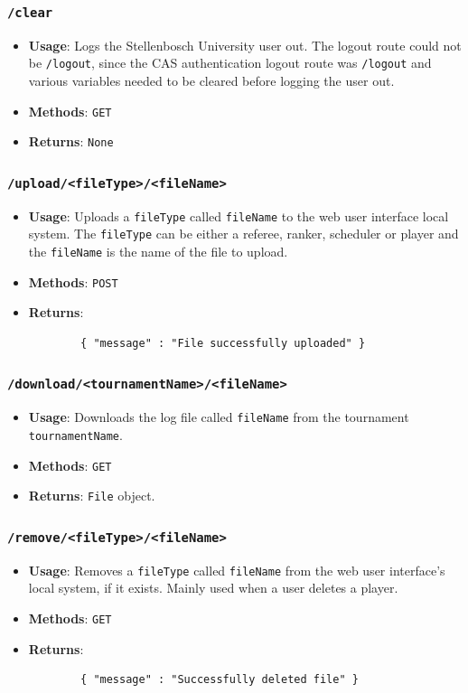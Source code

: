 \documentclass[a4paper, 12pt]{report}
\begin{document}
\subsubsection*{\texttt{/clear}}
\begin{itemize}
	\item \textbf{Usage}: Logs the Stellenbosch University user out. The logout
	route could not be \texttt{/logout}, since the CAS authentication logout route
	was \texttt{/logout} and various variables needed to be cleared before logging
	the user out.
	\item \textbf{Methods}: \texttt{GET}
	\item \textbf{Returns}: \texttt{None}
\end{itemize}
\subsubsection*{\texttt{/upload/<fileType>/<fileName>}}
\begin{itemize}
	\item \textbf{Usage}: Uploads a \texttt{fileType} called \texttt{fileName}
	to the web user interface local system. The \texttt{fileType} can be either
	a referee, ranker, scheduler or player and the \texttt{fileName} is the name
	of the file to upload.
	\item \textbf{Methods}: \texttt{POST}
	\item \textbf{Returns}:
	\begin{verbatim}
		{ "message" : "File successfully uploaded" }
	\end{verbatim}
\end{itemize}
\subsubsection*{\texttt{/download/<tournamentName>/<fileName>}}
\begin{itemize}
	\item \textbf{Usage}: Downloads the log file called \texttt{fileName} from
	the tournament \texttt{tournamentName}.
	\item \textbf{Methods}: \texttt{GET}
	\item \textbf{Returns}: \texttt{File} object.
\end{itemize}
\subsubsection*{\texttt{/remove/<fileType>/<fileName>}}
\begin{itemize}
	\item \textbf{Usage}: Removes a \texttt{fileType} called \texttt{fileName}
	from the web user interface's local system, if it exists. Mainly used when
	a user deletes a player.
	\item \textbf{Methods}: \texttt{GET}
	\item \textbf{Returns}:
	\begin{verbatim}
		{ "message" : "Successfully deleted file" }
	\end{verbatim}
\end{itemize}
\end{document}
